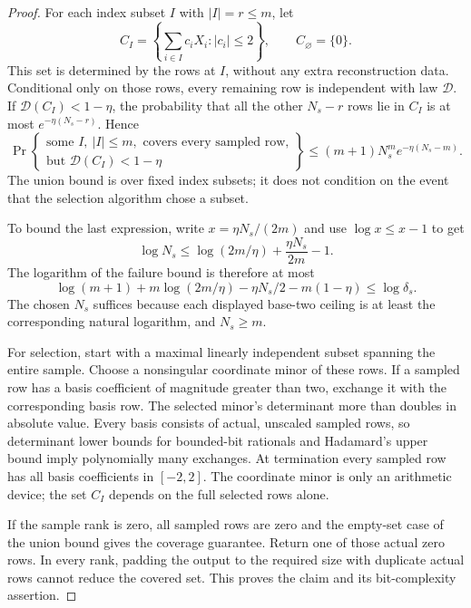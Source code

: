 \documentclass[11pt]{article}
\theoremstyle{definition}
\theoremstyle{remark}
\begin{document}
\begin{proof}
For each index subset $I$ with $|I|=r\le m$, let
\[
C_I=\left\{\sum_{i\in I}c_iX_i: |c_i|\le2\right\},
\qquad C_{\varnothing}=\{0\}.
\]
This set is determined by the rows at $I$, without any extra reconstruction data. Conditional only on those rows, every remaining row is independent with law $\mathcal D$. If $\mathcal D(C_I)<1-\eta$, the probability that all the other $N_s-r$ rows lie in $C_I$ is at most $e^{-\eta(N_s-r)}$. Hence
\[
\Pr\left\{\begin{array}{l}
\text{some }I,\ |I|\le m,\text{ covers every sampled row,}\\
\text{but }\mathcal D(C_I)<1-\eta
\end{array}\right\}
\le (m+1)N_s^m e^{-\eta(N_s-m)}.
\]
The union bound is over fixed index subsets; it does not condition on the event that the selection algorithm chose a subset.

To bound the last expression, write $x=\eta N_s/(2m)$ and use $\log x\le x-1$ to get
\[
\log N_s\le\log(2m/\eta)+\frac{\eta N_s}{2m}-1.
\]
The logarithm of the failure bound is therefore at most
\[
\log(m+1)+m\log(2m/\eta)-\eta N_s/2-m(1-\eta)
\le\log\delta_s.
\]
The chosen $N_s$ suffices because each displayed base-two ceiling is at least the corresponding natural logarithm, and $N_s\ge m$.

For selection, start with a maximal linearly independent subset spanning the entire sample. Choose a nonsingular coordinate minor of these rows. If a sampled row has a basis coefficient of magnitude greater than two, exchange it with the corresponding basis row. The selected minor's determinant more than doubles in absolute value. Every basis consists of actual, unscaled sampled rows, so determinant lower bounds for bounded-bit rationals and Hadamard's upper bound imply polynomially many exchanges. At termination every sampled row has all basis coefficients in $[-2,2]$. The coordinate minor is only an arithmetic device; the set $C_I$ depends on the full selected rows alone.

If the sample rank is zero, all sampled rows are zero and the empty-set case of the union bound gives the coverage guarantee. Return one of those actual zero rows. In every rank, padding the output to the required size with duplicate actual rows cannot reduce the covered set. This proves the claim and its bit-complexity assertion.
\end{proof}
\end{document}
